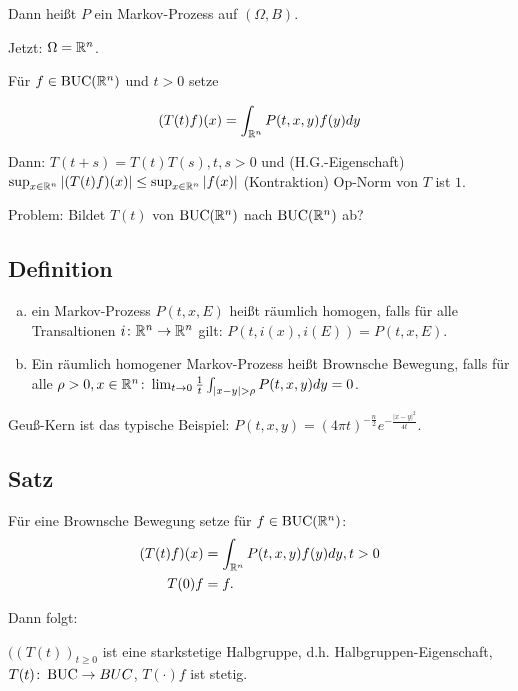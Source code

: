 Dann heißt $P$ ein Markov-Prozess auf $(\Omega, B)$.

Jetzt: $\Omega = \mathbb{R}^n$.

Für $f \in \operatorname{BUC}(\mathbb{R}^n)$ und $t > 0$ setze

$$
(T(t)f)(x) = \int_{\mathbb{R}^n} P(t,x,y)f(y) dy
$$

Dann: $T(t + s) = T(t)T(s), t, s > 0$ und (H.G.-Eigenschaft)
$\sup_{x \in \mathbb{R}^n} |(T(t)f)(x)| \leq \sup_{x \in \mathbb{R}^n} |f(x)|$ (Kontraktion) Op-Norm von $T$ ist $1$.

Problem: Bildet $T(t)$ von $\operatorname{BUC}(\mathbb{R}^n)$ nach $\operatorname{BUC}(\mathbb{R}^n)$ ab?

\subsection{Definition}

\begin{enumerate}[a)]
  \item ein Markov-Prozess $P(t,x,E)$ heißt räumlich homogen, falls für alle Transaltionen $i \colon \mathbb{R}^n \to \mathbb{R}^n$ gilt: $P(t, i(x), i(E)) = P(t,x,E)$.
  \item Ein räumlich homogener Markov-Prozess heißt Brownsche Bewegung, falls für alle $\rho > 0, x \in \mathbb{R}^n \colon \lim_{t \to 0} \frac{1}{t} \int_{|x - y| > \rho} P(t,x,y) dy = 0$.
\end{enumerate}

\begin{bem}
  Geuß-Kern ist das typische Beispiel: $P(t,x,y) = (4 \pi t)^{-\frac{n}{2}} e^{-\frac{|x - y|^2}{4t}}$.
\end{bem}

\subsection{Satz}

Für eine Brownsche Bewegung setze für $f \in \operatorname{BUC}(\mathbb{R}^n)$:
\begin{align*}
  (T(t)f)(x) &= \int_{\mathbb{R}^n} P(t,x,y) f(y) dy, t> 0 \\
  T(0)f &= f.
\end{align*}

Dann folgt:

$((T(t))_{t \geq 0}$ ist eine starkstetige Halbgruppe, d.h. Halbgruppen-Eigenschaft, $T(t) \colon \operatorname{BUC} \to BUC$, $T(\cdot)f$ ist stetig.

